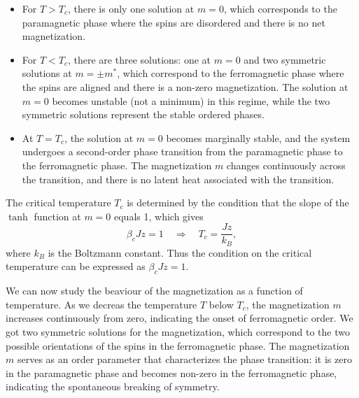 \begin{itemize}
    \item For \(T > T_c\), there is only one solution at \(m = 0\), which corresponds to the paramagnetic phase where the spins are disordered and there is no net magnetization.
    \item For \(T < T_c\), there are three solutions: one at \(m = 0\) and two symmetric solutions at \(m = \pm m^*\), which correspond to the ferromagnetic phase where the spins are aligned and there is a non-zero magnetization. The solution at \(m = 0\) becomes unstable (not a minimum) in this regime, while the two symmetric solutions represent the stable ordered phases.
    \item At \(T = T_c\), the solution at \(m = 0\) becomes marginally stable, and the system undergoes a second-order phase transition from the paramagnetic phase to the ferromagnetic phase. The magnetization \(m\) changes continuously across the transition, and there is no latent heat associated with the transition.
\end{itemize}
The critical temperature \(T_c\) is determined by the condition that the slope of the \(\tanh\) function at \(m = 0\) equals 1, which gives
\[
    \beta_c J z = 1 \quad \Rightarrow \quad T_c = \frac{J z}{k_B},
\]
where \(k_B\) is the Boltzmann constant. Thus the condition on the critical temperature can be expressed as \(\beta_c J z = 1\).

We can now study the beaviour of the magnetization as a function of temperature.
As we decreas the temperature \(T\) below \(T_c\), the magnetization \(m\) increases continuously from zero, indicating the onset of ferromagnetic order. We got two symmetric solutions for the magnetization, which correspond to the two possible orientations of the spins in the ferromagnetic phase. The magnetization \(m\) serves as an order parameter that characterizes the phase transition: it is zero in the paramagnetic phase and becomes non-zero in the ferromagnetic phase, indicating the spontaneous breaking of symmetry.


